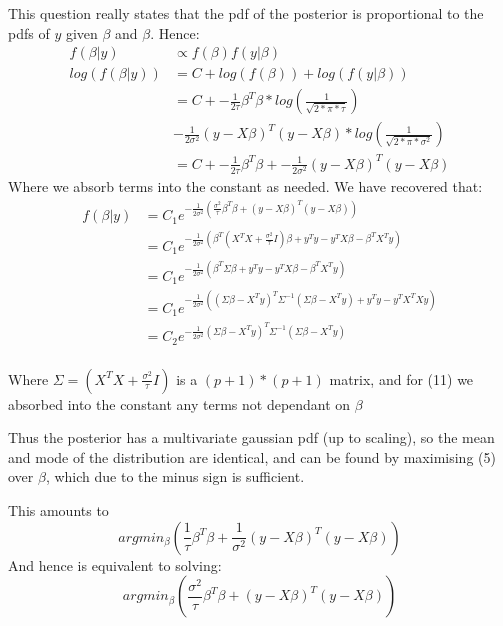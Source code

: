 This question really states that the pdf of the posterior is proportional to the pdfs of $y$ given $\beta$ and $\beta$.
Hence:
\begin{align}
    f(\beta\vert y) &\propto f(\beta) f(y\vert \beta) \\
    log(f(\beta\vert y)) &= C + log(f(\beta)) + log(f(y\vert \beta)) \\
     &= C + -\frac{1}{2\tau}\beta^T \beta * log\left(\frac{1}{\sqrt{2*\pi*\tau}}\right)\\ &-\frac{1}{2\sigma^2}\left(y - X\beta\right) ^T \left(y - X\beta\right) *  log\left(\frac{1}{\sqrt{2*\pi*\sigma^2}}\right) \\ 
     &= C + -\frac{1}{2\tau}\beta^T \beta  +  -\frac{1}{2\sigma^2}\left(y - X\beta\right) ^T \left(y - X\beta\right)
\end{align}
Where we absorb terms into the constant as needed. 
We have recovered that: 
\begin{align}
    f(\beta \vert y) &= C_1e^{ -\frac{1}{2\sigma^2}\left(\frac{\sigma^2}{\tau} \beta^T \beta  +\left(y - X\beta\right) ^T \left(y - X\beta\right)\right)} \\
    &= C_1e^{ -\frac{1}{2\sigma^2}\left(\beta^T\left(X^T X + \frac{\sigma^2}{\tau} I \right) \beta + y^T y - y^T X \beta - \beta^T X^T y\right)}\\
    &= C_1e^{ -\frac{1}{2\sigma^2}\left(\beta^T \Sigma  \beta + y^T y - y^T X \beta - \beta^T X^T y\right)}\\
    &= C_1e^{ -\frac{1}{2\sigma^2}\left(\left(\Sigma\beta - X^T y\right)^T\Sigma^{-1}   \left(\Sigma\beta - X^T y\right) + y^T y - y^T X^T X y\right)}\\
    &= C_2e^{ -\frac{1}{2\sigma^2}\left(\Sigma\beta - X^T y\right)^T\Sigma^{-1}   \left(\Sigma\beta - X^T y\right)}\\
\end{align}

Where $\Sigma = \left(X^T X + \frac{\sigma^2}{\tau} I \right)$ is a $(p+1) * (p+1)$ matrix, and for (11) we absorbed into the constant any terms not dependant on $\beta$
 
Thus the posterior has a multivariate gaussian pdf (up to scaling), so the mean and mode of the distribution are identical, and can be found by maximising (5) over $\beta$, which due to the minus sign is sufficient.

This amounts to
$$argmin_\beta \left( \frac{1}{\tau}\beta^T \beta  +  \frac{1}{\sigma^2}\left(y - X\beta\right) ^T \left(y - X\beta\right)\right)$$ 
And hence is equivalent to solving:
$$argmin_\beta  \left(\frac{\sigma^2}{\tau}\beta^T \beta  + \left(y - X\beta\right) ^T \left(y - X\beta\right)\right)$$

